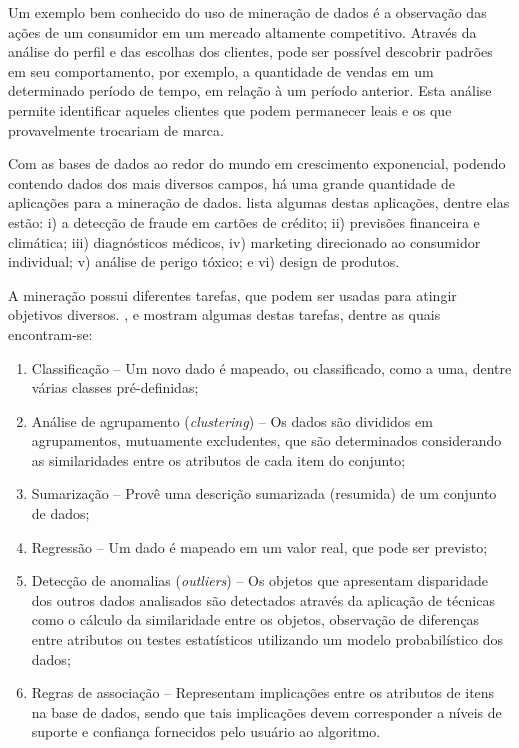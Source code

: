 Um exemplo bem conhecido do uso de mineração de dados é a observação das ações de um consumidor em um mercado altamente competitivo. Através da análise do perfil e das escolhas dos clientes, pode ser possível descobrir padrões em seu comportamento, por exemplo, a quantidade de vendas em um determinado período de tempo, em relação à um período anterior. Esta análise permite identificar aqueles clientes que podem permanecer leais e os que provavelmente trocariam de marca.

Com as bases de dados ao redor do mundo em crescimento exponencial, podendo contendo dados dos mais diversos campos, há uma grande quantidade de aplicações para a mineração de dados.  lista algumas destas aplicações, dentre elas estão: i) a detecção de fraude em cartões de crédito; ii) previsões financeira e climática; iii) diagnósticos médicos, iv) marketing direcionado ao consumidor individual; v) análise de perigo tóxico; e vi) design de produtos.

A mineração possui diferentes tarefas, que podem ser usadas para atingir objetivos diversos. ,  e  mostram algumas destas tarefas, dentre as quais encontram-se: 

\begin{enumerate}[label=\roman*.]
    \item Classificação {--} Um novo dado é mapeado, ou classificado, como a uma, dentre várias classes pré\hyp{}definidas;
    \item Análise de agrupamento (\textit{clustering}) {--} Os dados são divididos em agrupamentos, mutuamente excludentes, que são determinados considerando as similaridades entre os atributos de cada item do conjunto;
    \item Sumarização {--} Provê uma descrição sumarizada (resumida) de um conjunto de dados;
    \item Regressão {--} Um dado é mapeado em um valor real, que pode ser previsto;
    \item Detecção de anomalias (\textit{outliers}) {--} Os objetos que apresentam disparidade dos outros dados analisados são detectados através da aplicação de técnicas como o cálculo da similaridade entre os objetos, observação de diferenças entre atributos ou testes estatísticos utilizando um modelo probabilístico dos dados;
    \item Regras de associação {--} Representam implicações entre os atributos de itens na base de dados, sendo que tais implicações devem corresponder a níveis de suporte e confiança fornecidos pelo usuário ao algoritmo.
\end{enumerate}

